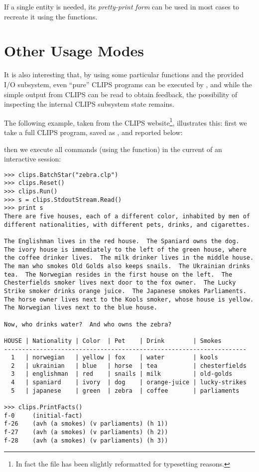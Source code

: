 If a single entity is needed, its \emph{pretty-print form} can be used
in most cases to recreate it using the  functions.


\section{Other Usage Modes\label{pyclips-ov-otheruses}}

It is also interesting that, by using some particular functions and the
provided I/O subsystem, even ``pure'' CLIPS programs can be executed by
\pyclips{}, and while the simple output from CLIPS can be read to obtain
feedback, the possibility of inspecting the internal CLIPS subsystem
state remains.

The following example, taken from the CLIPS website\footnote{In fact
the file has been slightly reformatted for typesetting reasons.},
illustrates this: first we take a full CLIPS program, saved as
, and reported below:



then we execute all commands (using the  function)
in the current  of an interactive \pyclips{} session:

\begin{verbatim}
>>> clips.BatchStar("zebra.clp")
>>> clips.Reset()
>>> clips.Run()
>>> s = clips.StdoutStream.Read()
>>> print s
There are five houses, each of a different color, inhabited by men of
different nationalities, with different pets, drinks, and cigarettes.

The Englishman lives in the red house.  The Spaniard owns the dog.
The ivory house is immediately to the left of the green house, where
the coffee drinker lives.  The milk drinker lives in the middle house.
The man who smokes Old Golds also keeps snails.  The Ukrainian drinks
tea.  The Norwegian resides in the first house on the left.  The
Chesterfields smoker lives next door to the fox owner.  The Lucky
Strike smoker drinks orange juice.  The Japanese smokes Parliaments.
The horse owner lives next to the Kools smoker, whose house is yellow.
The Norwegian lives next to the blue house.

Now, who drinks water?  And who owns the zebra?

HOUSE | Nationality | Color  | Pet    | Drink        | Smokes
--------------------------------------------------------------------
  1   | norwegian   | yellow | fox    | water        | kools
  2   | ukrainian   | blue   | horse  | tea          | chesterfields
  3   | englishman  | red    | snails | milk         | old-golds
  4   | spaniard    | ivory  | dog    | orange-juice | lucky-strikes
  5   | japanese    | green  | zebra  | coffee       | parliaments

>>> clips.PrintFacts()
f-0     (initial-fact)
f-26    (avh (a smokes) (v parliaments) (h 1))
f-27    (avh (a smokes) (v parliaments) (h 2))
f-28    (avh (a smokes) (v parliaments) (h 3))
\end{verbatim}

